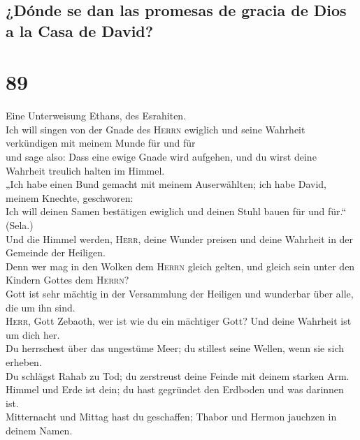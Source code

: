 \hypertarget{duxf3nde-se-dan-las-promesas-de-gracia-de-dios-a-la-casa-de-david}{%
\subsection{¿Dónde se dan las promesas de gracia de Dios a la Casa de
David?}\label{duxf3nde-se-dan-las-promesas-de-gracia-de-dios-a-la-casa-de-david}}

\hypertarget{section-88}{%
\section{89}\label{section-88}}

 Eine Unterweisung Ethans, des Esrahiten.\\
 Ich will singen von der Gnade des \textsc{Herrn} ewiglich
und seine Wahrheit verkündigen mit meinem Munde für und für\\
 und sage also: Dass eine ewige Gnade wird aufgehen, und
du wirst deine Wahrheit treulich halten im Himmel.\\
 „Ich habe einen Bund gemacht mit meinem Auserwählten; ich
habe David, meinem Knechte, geschworen:\\
 Ich will deinen Samen bestätigen ewiglich und deinen
Stuhl bauen für und für.`` (Sela.)\\
 Und die Himmel werden, \textsc{Herr}, deine Wunder
preisen und deine Wahrheit in der Gemeinde der Heiligen.\\
 Denn wer mag in den Wolken dem \textsc{Herrn} gleich
gelten, und gleich sein unter den Kindern Gottes dem \textsc{Herrn}?\\
 Gott ist sehr mächtig in der Versammlung der Heiligen und
wunderbar über alle, die um ihn sind.\\
 \textsc{Herr}, Gott Zebaoth, wer ist wie du ein mächtiger
Gott? Und deine Wahrheit ist um dich her.\\
 Du herrschest über das ungestüme Meer; du stillest seine
Wellen, wenn sie sich erheben.\\
 Du schlägst Rahab zu Tod; du zerstreust deine Feinde mit
deinem starken Arm.\\
 Himmel und Erde ist dein; du hast gegründet den Erdboden
und was darinnen ist.\\
 Mitternacht und Mittag hast du geschaffen; Thabor und
Hermon jauchzen in deinem Namen.\\
